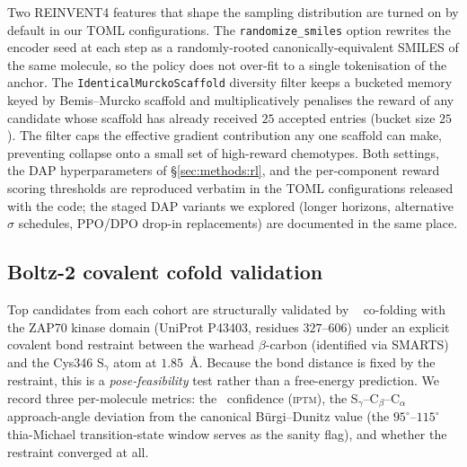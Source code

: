 Two REINVENT4 features that shape the sampling distribution are turned on by default in our TOML configurations. The \texttt{randomize\_smiles} option rewrites the encoder seed at each step as a randomly-rooted canonically-equivalent SMILES of the same molecule, so the policy does not over-fit to a single tokenisation of the anchor. The \texttt{IdenticalMurckoScaffold} diversity filter \cite{bemis1996murcko} keeps a bucketed memory keyed by Bemis--Murcko scaffold and multiplicatively penalises the reward of any candidate whose scaffold has already received $25$ accepted entries (bucket size $25$). The filter caps the effective gradient contribution any one scaffold can make, preventing collapse onto a small set of high-reward chemotypes. Both settings, the DAP hyperparameters of \S\ref{sec:methods:rl}, and the per-component reward scoring thresholds are reproduced verbatim in the TOML configurations released with the code; the staged DAP variants we explored (longer horizons, alternative $\sigma$ schedules, PPO/DPO drop-in replacements) are documented in the same place.

\subsection{Boltz-2 covalent cofold validation}\label{sec:supp:cofold}

Top candidates from each cohort are structurally validated by \boltz~\cite{passaro2025boltz2} co-folding with the ZAP70 kinase domain (UniProt \textsc{P43403}, residues $327$--$606$) under an explicit covalent bond restraint between the warhead $\beta$-carbon (identified via SMARTS) and the Cys346 S$_\gamma$ atom at $1.85$~\r{A}. Because the bond distance is fixed by the restraint, this is a \emph{pose-feasibility} test rather than a free-energy prediction. We record three per-molecule metrics: the \boltz\ confidence (\textsc{iptm}), the S$_\gamma$--C$_\beta$--C$_\alpha$ approach-angle deviation from the canonical Bürgi--Dunitz value (the $95^\circ$--$115^\circ$ thia-Michael transition-state window \cite{burgi1974stereochemistry} serves as the sanity flag), and whether the restraint converged at all.
